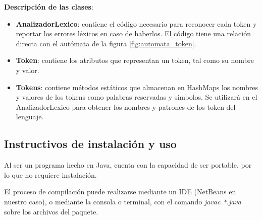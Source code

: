 {\bf Descripción de las clases}: 
\begin{itemize}
\item {\bf AnalizadorLexico}: contiene el código necesario para reconocer cada token y reportar los errores léxicos en caso de haberlos. El código tiene una relación directa con el autómata de la figura \ref{fig:automata_token}.
\item {\bf Token}: contiene los atributos que representan un token, tal como su nombre y valor.
\item {\bf Tokens}: contiene métodos estáticos que almacenan en HashMaps los nombres y valores de los tokens como palabras reservadas y símbolos. Se utilizará en el AnalizadorLexico para obtener los nombres y patrones de los token del lenguaje.
\end{itemize}




\subsection{Instructivos de instalación y uso}
Al ser un programa hecho en Java, cuenta con la capacidad de ser portable, por lo que no requiere instalación.

El proceso de compilación puede realizarse mediante un IDE (NetBeans en nuestro caso), o mediante la consola o terminal, con el comando \emph{javac *.java} sobre los archivos del paquete.   

